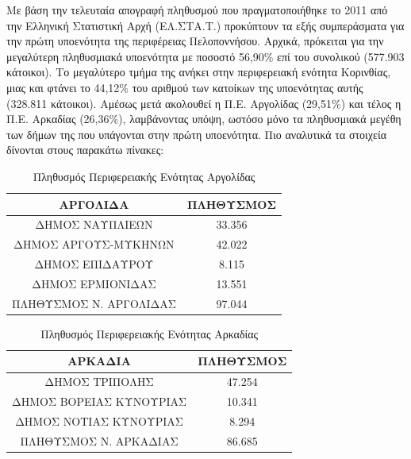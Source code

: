 \documentclass[12pt]{article}
\begin{document}
	Με βάση την τελευταία απογραφή πληθυσμού που πραγματοποιήθηκε το 2011 από την Ελληνική Στατιστική Αρχή (ΕΛ.ΣΤΑ.Τ.) προκύπτουν τα εξής συμπεράσματα για την πρώτη υποενότητα της περιφέρειας Πελοποννήσου. Αρχικά, πρόκειται για την μεγαλύτερη πληθυσμιακά υποενότητα με ποσοστό 56,90\% επί του συνολικού (577.903 κάτοικοι). Το μεγαλύτερο τμήμα της ανήκει στην περιφερειακή ενότητα Κορινθίας, μιας και φτάνει το 44,12\% του αριθμού των κατοίκων της υποενότητας αυτής (328.811 κάτοικοι). Αμέσως μετά ακολουθεί η Π.Ε. Αργολίδας (29,51\%) και τέλος η Π.Ε. Αρκαδίας (26,36\%), λαμβάνοντας υπόψη, ωστόσο μόνο τα πληθυσμιακά μεγέθη των δήμων της που υπάγονται στην πρώτη υποενότητα. Πιο αναλυτικά τα στοιχεία δίνονται στους παρακάτω πίνακες:  
	
	\begin{table}[H]
		\centering
		\begin{tabular}{|c|c|}
			\hline
			\textbf{ΑΡΓΟΛΙΔΑ} & \textbf{ΠΛΗΘΥΣΜΟΣ} \\ \hline
			ΔΗΜΟΣ ΝΑΥΠΛΙΕΩΝ & 33.356 \\ \hline
			ΔΗΜΟΣ ΑΡΓΟΥΣ-ΜΥΚΗΝΩΝ & 42.022 \\ \hline
			ΔΗΜΟΣ ΕΠΙΔΑΥΡΟΥ & 8.115 \\ \hline
			ΔΗΜΟΣ ΕΡΜΙΟΝΙΔΑΣ & 13.551 \\ \hline
			ΠΛΗΘΥΣΜΟΣ Ν. ΑΡΓΟΛΙΔΑΣ & 97.044 \\ \hline
		\end{tabular}
		\caption{Πληθυσμός Περιφερειακής Ενότητας Αργολίδας}
		\label{The label}
	\end{table}

	\begin{table}[H]
		\centering
		\begin{tabular}{|c|c|}
			\hline
			\textbf{ΑΡΚΑΔΙΑ} & \textbf{ΠΛΗΘΥΣΜΟΣ} \\ \hline
			ΔΗΜΟΣ ΤΡΙΠΟΛΗΣ & 47.254 \\ \hline
			ΔΗΜΟΣ ΒΟΡΕΙΑΣ ΚΥΝΟΥΡΙΑΣ & 10.341 \\ \hline
			ΔΗΜΟΣ ΝΟΤΙΑΣ ΚΥΝΟΥΡΙΑΣ & 8.294 \\ \hline
			ΠΛΗΘΥΣΜΟΣ Ν. ΑΡΚΑΔΙΑΣ & 86.685 \\ \hline
		\end{tabular}
		\caption{Πληθυσμός Περιφερειακής Ενότητας Αρκαδίας}
		\label{The label}
	\end{table}
\end{document}
